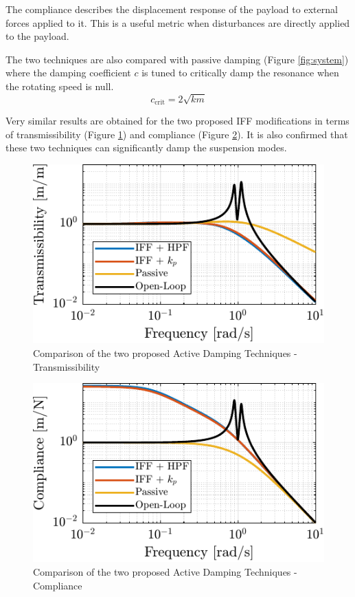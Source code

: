 \documentclass[10pt]{iopart}
\begin{document}
The compliance describes the displacement response of the payload to external forces applied to it.
This is a useful metric when disturbances are directly applied to the payload.

The two techniques are also compared with passive damping (Figure \ref{fig:system}) where the damping coefficient \(c\) is tuned to critically damp the resonance when the rotating speed is null.
\begin{equation}
  c_\text{crit} = 2 \sqrt{k m}
\end{equation}

Very similar results are obtained for the two proposed IFF modifications in terms of transmissibility (Figure \ref{fig:comp_transmissibility}) and compliance (Figure \ref{fig:comp_compliance}).
It is also confirmed that these two techniques can significantly damp the suspension modes.

\begin{figure}[htbp]
\centering
\includegraphics[scale=1]{figs/fig19.pdf}
\caption{\label{fig:comp_transmissibility}Comparison of the two proposed Active Damping Techniques - Transmissibility}
\end{figure}


\begin{figure}[htbp]
\centering
\includegraphics[scale=1]{figs/fig20.pdf}
\caption{\label{fig:comp_compliance}Comparison of the two proposed Active Damping Techniques - Compliance}
\end{figure}
\end{document}
